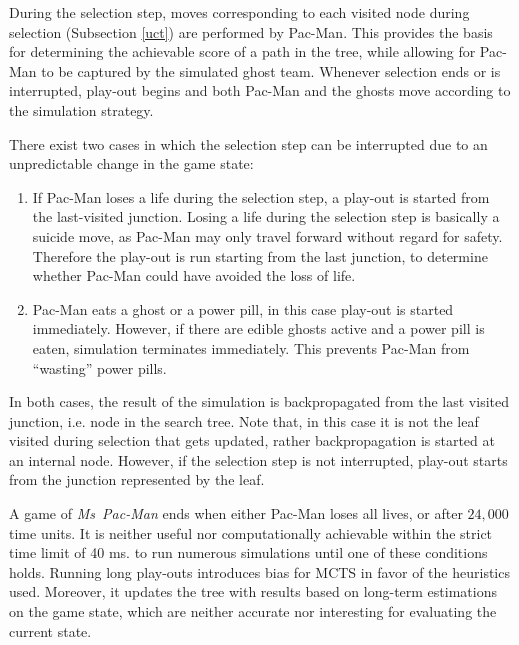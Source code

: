 \documentclass[journal]{IEEEtran}
\begin{document}
During the selection step, moves corresponding to each visited node during selection (Subsection \ref{uct}) are performed by Pac-Man. This provides the basis for determining the achievable score of a path in the tree, while allowing for Pac-Man to be captured by the simulated ghost team. Whenever selection ends or is interrupted, play-out begins and both Pac-Man and the ghosts move according to the simulation strategy.

There exist two cases in which the selection step can be interrupted due to an unpredictable change in the game state:
\begin{enumerate}
\item If Pac-Man loses a life during the selection step, a play-out is started from the last-visited junction. Losing a life during the selection step is basically a suicide move, as Pac-Man may only travel forward without regard for safety. Therefore the play-out is run starting from the last junction, to determine whether Pac-Man could have avoided the loss of life. 
\item Pac-Man eats a ghost or a power pill, in this case play-out is started immediately. However, if there are edible ghosts active and a power pill is eaten, simulation terminates immediately. This prevents Pac-Man from ``wasting'' power pills.
\end{enumerate}
In both cases, the result of the simulation is backpropagated from the last visited junction, i.e. node in the search tree. Note that, in this case it is not the leaf visited during selection that gets updated, rather backpropagation is started at an internal node. However, if the selection step is not interrupted, play-out starts from the junction represented by the leaf.

A game of {\it{Ms~Pac-Man}} ends when either Pac-Man loses all lives, or after $24,000$ time units. It is neither useful nor computationally achievable within the strict time limit of 40 ms. to run numerous simulations until one of these conditions holds. Running long play-outs introduces bias for MCTS in favor of the heuristics used. Moreover, it updates the tree with results based on long-term estimations on the game state, which are neither accurate nor interesting for evaluating the current state.
\end{document}
